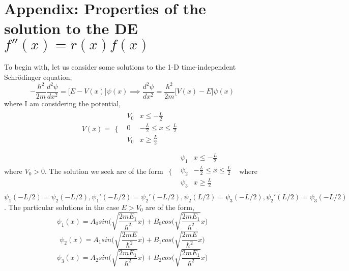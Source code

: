 \documentclass{article}
\begin{document}
\section*{Appendix: Properties of the solution to the DE $f''(x)=r(x)f(x)$}
To begin with, let us consider some solutions to the 1-D time-independent Schr\"odinger equation,
\begin{equation*}
-\frac{\hbar^2}{2 m} \frac{d^2 \psi}{d x^2} = \bigg[E-V(x)\bigg]\psi(x) \implies \frac{d^2 \psi}{d x^2} = \frac{\hbar^2}{2 m}\bigg[V(x)-E\bigg]\psi(x)
\end{equation*}
where I am considering the potential,
\begin{equation*}
V(x) = \begin{array}{cc}
  \bigg\{ & 
    \begin{array}{cc}
      V_0 & x\leq -\frac{L}{2} \\
      0 & -\frac{L}{2}\leq x\leq \frac{L}{2} \\
      V_0 & x\geq \frac{L}{2} \\
    \end{array}
\end{array}
\end{equation*}
where $V_0>0$. The solution we seek are of the form $\begin{array}{cc}\bigg\{ & \begin{array}{cc}
      \psi_1 & x\leq -\frac{L}{2} \\
      \psi_2 & -\frac{L}{2}\leq x\leq \frac{L}{2} \\
      \psi_3 & x\geq \frac{L}{2} \\
    \end{array}
\end{array}$
where $\psi_1(-L/2)=\psi_2(-L/2),\psi_1'(-L/2)=\psi_2'(-L/2),\psi_2(L/2)=\psi_3(-L/2),\psi_2'(L/2)=\psi_3(-L/2)$. The particular solutions in the case $E > V_0$ are of the form,
\begin{equation*}
\psi_1(x) = A_0 sin\bigg(\sqrt{\frac{2 m E_1}{\hbar^2}} x\bigg) + B_0 cos\bigg(\sqrt{\frac{2 m E_1}{\hbar^2}} x\bigg)
\end{equation*}
\begin{equation*}
\psi_2(x) = A_1 sin\bigg(\sqrt{\frac{2 m E}{\hbar^2}} x\bigg) + B_1 cos\bigg(\sqrt{\frac{2 m E}{\hbar^2}} x\bigg)
\end{equation*}
\begin{equation*}
\psi_3(x) = A_2 sin\bigg(\sqrt{\frac{2 m E_1}{\hbar^2}} x\bigg) + B_2 cos\bigg(\sqrt{\frac{2 m E_1}{\hbar^2}} x\bigg)
\end{equation*}
\end{document}
